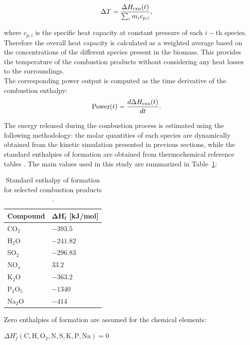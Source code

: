 \documentclass[preprint,12pt]{elsarticle}
\begin{document}
\begin{equation}
\Delta T = \frac{\Delta H_{\rm rxn}(t)}{\sum_i m_i c_{p,i}},
\end{equation}

where $c_{p,i}$ is the specific heat capacity at constant pressure of each $i-$th species. Therefore the overall heat capacity is calculated as a weighted average based on the concentrations of the different species present in the biomass. This provides the temperature of the combustion products without considering any heat losses to the surroundings.\\


The corresponding power output is computed as the time derivative of the combustion enthalpy:
\begin{equation}
\text{Power}(t) = \frac{d\Delta H_{\rm rxn}(t)}{dt}.
\end{equation}

The energy released during the combustion process is estimated using the following methodology: the molar quantities of each species are dynamically obtained from the kinetic simulation presented in previous sections, while the standard enthalpies of formation are obtained from thermochemical reference tables \cite{AtkinsPChem}. The main values used in this study are summarized in Table~\ref{tabla:entalpias_formacion}:\\

\begin{table}[H]
\begin{center}
\caption{Standard enthalpy of formation for selected combustion products \cite{AtkinsPChem}.}
\label{tabla:entalpias_formacion}
\begin{tabular*}{6cm}{l p{3cm}} \hline
\textbf{Compound} & $\boldsymbol{\Delta H_f^\circ}$ \textbf{[kJ/mol]} \\ \hline
CO$_2$           & $-393.5$ \\
H$_2$O           & $-241.82$ \\
SO$_2$           & $-296.83$ \\
NO$_x$           & $33.2$ \\
K$_2$O           & $-363.2$ \\
P$_2$O$_5$       & $-1340$ \\
Na$_2$O          & $-414$ \\ \hline
\end{tabular*}
\end{center}
\end{table}

Zero enthalpies of formation are assumed for the chemical elements:
\begin{center}
$\Delta H_f^{\circ}(\text{C}, \text{H}, \text{O}_2, \text{N}, \text{S}, \text{K}, \text{P}, \text{Na}) = 0$
\end{center}
\end{document}
